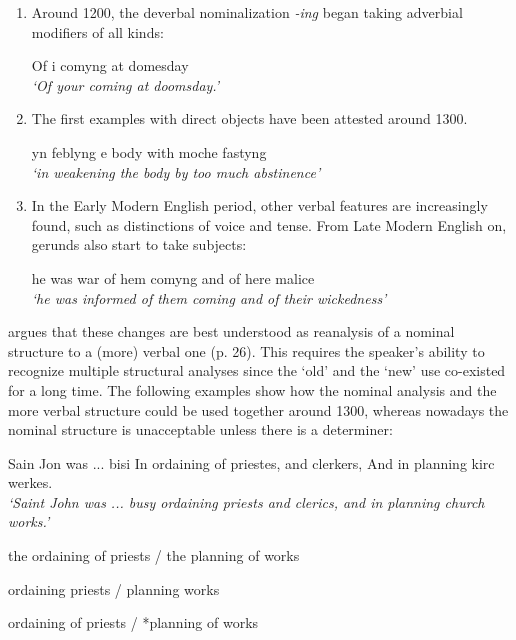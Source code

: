 \begin{enumerate}
\item Around 1200, the deverbal nominalization \emph{-ing} began taking adverbial modifiers of all kinds:

\ea
Of \th i comyng at domesday\\
{\em `Of your coming \emph{at doomsday}.'}
\z

\item The first examples with direct objects have been attested around 1300.

\ea
yn feblyng \th e body with moche fastyng
\\ {\em `in weakening the body by too much abstinence'}
\z

\item In the Early Modern English period, other verbal features are increasingly found, such as distinctions of voice and tense. From Late Modern English on, gerunds also start to take subjects:

\ea 
he was war of hem comyng and of here malice \\
{\em `he was informed of them coming and of their wickedness'}
\z
\end{enumerate}

\citet{fanego04reanalysis} argues that these changes are best understood as reanalysis of a nominal structure to a (more) verbal one (p. 26). This requires the speaker's ability to recognize multiple structural analyses since the `old' and the `new' use co-existed for a long time. The following examples show how the nominal analysis and the more verbal structure could be used together around 1300, whereas nowadays the nominal structure is unacceptable unless there is a determiner:

\ea
\label{e:gerund-last}
Sain Jon was ... bisi In ordaining of priestes, and clerkers, And in planning kirc werkes.\\
{\em `Saint John was ... busy ordaining priests and clerics, and in planning church works.'}

\item the ordaining of priests / the planning of works
\item ordaining priests / planning works
\item *ordaining of priests / *planning of works
\z

